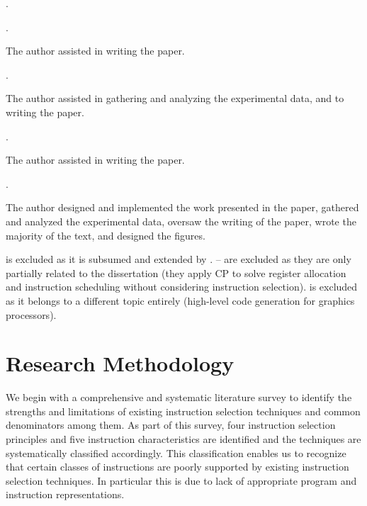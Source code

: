 \begin{publications}[resume]
  \item {}
    .
  \item {}
    .
    \begin{authorsContribution}
      The author assisted in writing the paper.
    \end{authorsContribution}
  \item {}
    .
    \begin{authorsContribution}
      The author assisted in gathering and analyzing the experimental data, and
      to writing the paper.
    \end{authorsContribution}
  \item {}
    .
    \begin{authorsContribution}
      The author assisted in writing the paper.
    \end{authorsContribution}
  \item {}
    .
    \begin{authorsContribution}
      The author designed and implemented the work presented in the paper,
      gathered and analyzed the experimental data, oversaw the writing of the
      paper, wrote the majority of the text, and designed the figures.
    \end{authorsContribution}
\end{publications}
%
 is excluded as it is subsumed and extended by
.
%
-- are excluded as they are only
partially related to the dissertation (they apply \glsdesc{CP} to solve
\gls{register allocation} and \gls{instruction scheduling} without considering
\gls{instruction selection}).
%
 is excluded as it belongs to a different topic
entirely (high-level code generation for graphics processors).


\section{Research Methodology}

We begin with a comprehensive and systematic literature survey to identify the
strengths and limitations of existing \gls{instruction selection} techniques and
common denominators among them.
%
As part of this survey, four \gls{instruction selection} \glspl{principle} and
five \glspl{instruction characteristic} are identified and the techniques are
systematically classified accordingly.
%
This classification enables us to recognize that certain classes of
\glspl{instruction} are poorly supported by existing \gls{instruction selection}
techniques.
%
In particular this is due to lack of appropriate \gls{program} and
\gls{instruction} representations.

